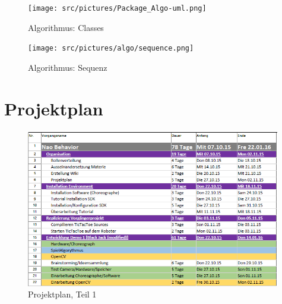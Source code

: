 \begin{appendix}
        \cleardoubleemptypage

        \begin{figure}[ht]
            \centering
            \texttt{[image: src/pictures/Package\_Algo-uml.png]}
            \caption{Algorithmus: Classes}
            \label{img:algo:classes}
        \end{figure}

        \cleardoubleemptypage

        \begin{figure}[ht]
            \centering
            \texttt{[image: src/pictures/algo/sequence.png]}
            \caption{Algorithmus: Sequenz}
            \label{img:algo:sequence}
        \end{figure}

        \cleardoubleemptypage

        \section{Projektplan}

            \begin{figure}[ht]
                \centering
                \includegraphics[width=0.99\textwidth]{src/pictures/planung1.png}
                \caption{Projektplan, Teil 1}
                \label{img:planung1}
            \end{figure}


\end{appendix}

